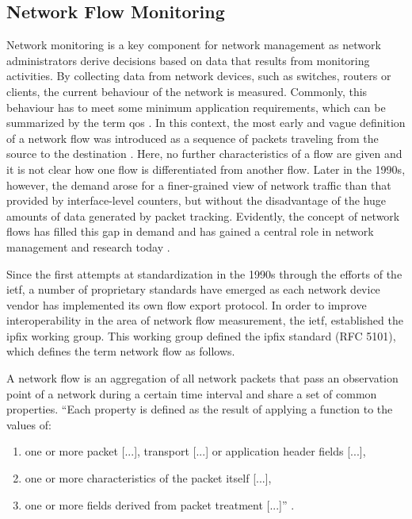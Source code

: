 \subsection{Network Flow Monitoring}\label{subsec:network_flow_monitoring}

Network monitoring is a key component for network management as network administrators derive decisions based on data that results from monitoring activities. By collecting data from network devices, such as switches, routers or clients, the current behaviour of the network is measured. Commonly, this behaviour has to meet some minimum application requirements, which can be summarized by the term \gls{qos} \cite[406]{tanenbaum2021computer}. In this context, the most early and vague definition of a network flow was introduced as a sequence of packets traveling from the source to the destination \cite{clark1988design}. Here, no further characteristics of a flow are given and it is not clear how one flow is differentiated from another flow. Later in the 1990s, however, the demand arose for a finer-grained view of network traffic than that provided by interface-level counters, but without the disadvantage of the huge amounts of data generated by packet tracking. Evidently, the concept of network flows has filled this gap in demand and has gained a central role in network management and research today \cite{trammell2011introduction}.

Since the first attempts at standardization in the 1990s through the efforts of the \gls{ietf}, a number of proprietary standards have emerged as each network device vendor has implemented its own flow export protocol. In order to improve interoperability in the area of network flow measurement, the \gls{ietf}, established the \gls{ipfix} working group. This working group defined the \gls{ipfix} standard (RFC 5101), which defines the term network flow as follows.

\begin{definition}
A network flow is an aggregation of all network packets that pass an observation point of a network during a certain time interval and share a set of common properties. ``Each property is defined as the result of applying a function to the values of:
\begin{enumerate}
    \item one or more packet [...], transport [...] or application header fields [...],
    \item one or more characteristics of the packet itself [...],
    \item one or more fields derived from packet treatment [...]'' \cite{rfc5101}.
\end{enumerate}

\end{definition}


